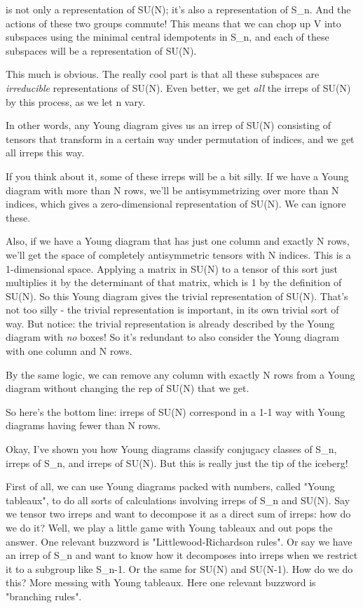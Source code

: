 is not only a representation of SU(N); it's also a representation of
S_{n}.  And the actions of these two groups commute!  This means that
we can chop up V into subspaces using the minimal central idempotents
in S_{n}, and each of these subspaces will be a representation of SU(N).

This much is obvious.  The really cool part is that all these subspaces
are \emph{irreducible} representations of SU(N).  Even better, we get 
\emph{all} the irreps of SU(N) by this process, as we let n vary.

In other words, any Young diagram gives us an irrep of SU(N) consisting
of tensors that transform in a certain way under permutation of indices,
and we get all irreps this way.  

If you think about it, some of these irreps will be a bit silly.  If we
have a Young diagram with more than N rows, we'll be antisymmetrizing
over more than N indices, which gives a zero-dimensional representation
of SU(N).  We can ignore these.  

Also, if we have a Young diagram that has just one column and exactly N
rows, we'll get the space of completely antisymmetric tensors with N
indices.  This is a 1-dimensional space.  Applying a matrix in SU(N) to
a tensor of this sort just multiplies it by the determinant of that
matrix, which is 1 by the definition of SU(N).  So this Young diagram
gives the trivial representation of SU(N).  That's not too silly - the
trivial representation is important, in its own trivial sort of way.
But notice: the trivial representation is already described by the Young
diagram with \emph{no} boxes!  So it's redundant to also consider the Young
diagram with one column and N rows.

By the same logic, we can remove any column with exactly N rows from a 
Young diagram without changing the rep of SU(N) that we get.

So here's the bottom line: irreps of SU(N) correspond in a 1-1 way with
Young diagrams having fewer than N rows.  

Okay, I've shown you how Young diagrams classify conjugacy classes of
S_{n}, irreps of S_{n}, and irreps of SU(N).  But this is really just the
tip of the iceberg!

First of all, we can use Young diagrams packed with numbers, called
"Young tableaux", to do all sorts of calculations involving
irreps of S_{n} and SU(N).  Say we tensor two irreps and want to
decompose it as a direct sum of irreps: how do we do it?  Well, we play
a little game with Young tableaux and out pops the answer.  One relevant
buzzword is "Littlewood-Richardson rules".  Or say we have an
irrep of S_{n} and want to know how it decomposes into irreps
when we restrict it to a subgroup like S_{n-1}.  Or the same for
SU(N) and SU(N-1).  How do we do this?  More messing with Young
tableaux.  Here one relevant buzzword is "branching rules".

